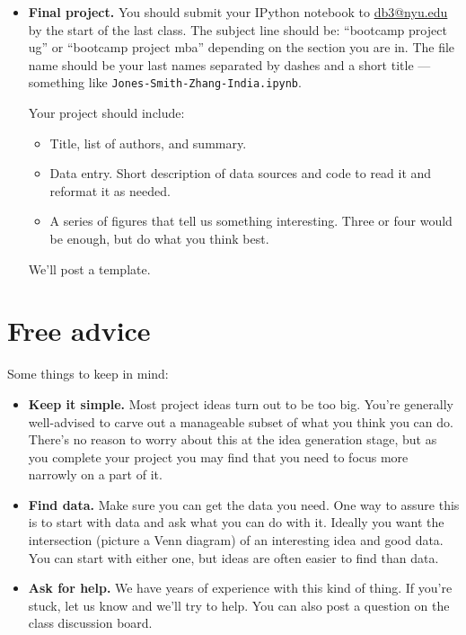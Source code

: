 \documentclass[11pt]{article}
\begin{document}
\begin{itemize}
\item {\bf Final project.}
You should submit your IPython notebook to \href{mailto:db3@nyu.edu}{db3@nyu.edu}
by the start of the last class.
The subject line should be:  ``bootcamp project ug'' or ``bootcamp project mba''
depending on the section you are in.
The file name should be your last names separated by dashes and a short title ---
something like {\tt Jones-Smith-Zhang-India.ipynb}.

Your project should include:
\begin{itemize}
\item Title, list of authors, and summary.
\item Data entry.  Short description of data sources and code to read it
and reformat it as needed.
\item A series of figures that tell us something interesting.
Three or four would be enough, but do what you think best.
\end{itemize}
We'll post a template.
\end{itemize}


\section*{Free advice}

Some things to keep in mind:
%
\begin{itemize}
\item {\bf Keep it simple.}
Most project ideas turn out to be too big.  You're generally well-advised
to carve out a manageable subset of what you think you can do.
There's no reason to worry about this at the idea generation stage, 
but as you complete your project you may find that you need to focus 
more narrowly on a part of it.  

\item {\bf Find data.}  Make sure you can get the data you need.
One way to assure this is to start with data and ask what you can do with it.
Ideally you want the intersection (picture a Venn diagram) of an interesting
idea and good data.  You can start with either one, but ideas are often easier to
find than data.

\item {\bf Ask for help.}
We have years of experience with this kind of thing.
If you're stuck, let us know and we'll try to help.
You can also post a question on the class discussion board.

\end{itemize}




\end{document}
